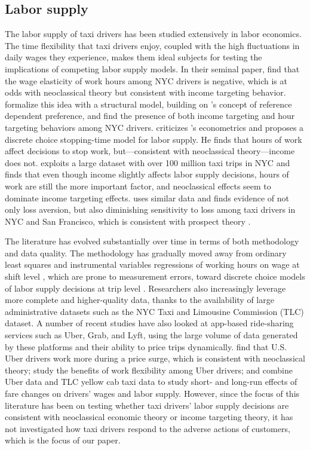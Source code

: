 \documentclass[reviewmode]{AEA}
\begin{document}
\subsection{Labor supply}
The labor supply of taxi drivers has been studied extensively in labor economics. The time flexibility that taxi drivers enjoy, coupled with the high fluctuations in daily wages they experience, makes them ideal subjects for testing the implications of competing labor supply models. In their seminal paper, \citet{camerer1997labor} find that the wage elasticity of work hours among NYC drivers is negative, which is at odds with neoclassical theory but consistent with income targeting behavior. \citet{crawford2011new} formalize this idea with a structural model, building on \citeauthor{kHoszegi2006model}'s \citeyear{kHoszegi2006model} concept of reference dependent preference, and find the presence of both income targeting and hour targeting behaviors among NYC drivers. \citet{farber2005tomorrow} criticizes \citeauthor{camerer1997labor}'s econometrics and proposes a discrete choice stopping-time model for labor supply. He finds that hours of work affect decisions to stop work, but---consistent with neoclassical theory---income does not. \citet{farber2015you} exploits a large dataset with over 100 million taxi trips in NYC and finds that even though income slightly affects labor supply decisions, hours of work are still the more important factor, and neoclassical effects seem to dominate income targeting effects. \citet{martin2017quit} uses similar data and finds evidence of not only loss aversion, but also diminishing sensitivity to loss among taxi drivers in NYC and San Francisco, which is consistent with prospect theory \citep{kahneman1979prospect}. 

The literature has evolved substantially over time  in terms of both methodology and data quality. The methodology has gradually moved away from ordinary least squares and instrumental variables regressions of working hours on wage  at shift level \citep{camerer1997labor}, which are prone to measurement errors, toward discrete choice models of labor supply decisions at trip level \citep{farber2005tomorrow,farber2015you,crawford2011new,martin2017quit}. Researchers also increasingly leverage more complete and higher-quality data, thanks to the availability of large administrative datasets such as the NYC Taxi and Limousine Commission (TLC) dataset. A number of recent studies have also looked at app-based ride-sharing services such as Uber, Grab, and Lyft, using the large volume of data generated by these platforms and their ability to price trips dynamically. \citet{chen2015dynamic} find that U.S. Uber drivers work more during a price surge, which is consistent with neoclassical theory; \citet{chen2017value} study the benefits of work flexibility among Uber drivers; and \citet{hall2017labor} combine Uber data and TLC yellow cab taxi data to study short- and long-run effects of fare changes on drivers' wages and labor supply. However, since the focus of this literature has been on testing whether taxi drivers' labor supply decisions are consistent with neoclassical economic theory or income targeting theory, it has not investigated how taxi drivers respond to the adverse actions of customers, which is the focus of our paper.
\end{document}

